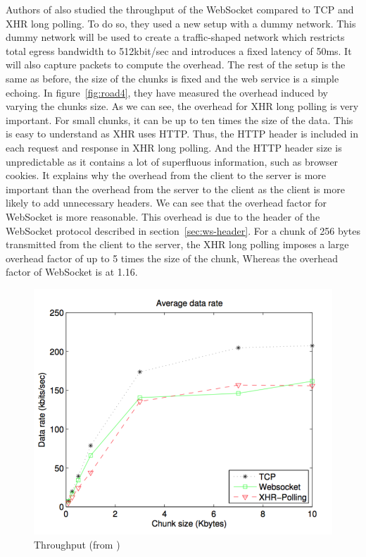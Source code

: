 \documentclass[10pt,journal,compsoc]{IEEEtran}
\newcommand{\ws}{WebSocket}
\begin{document}
Authors of \cite{roadblock} also studied the throughput of the \ws{} compared to TCP and XHR long polling.
To do so, they used a new setup with a dummy network. %
This dummy network will be used to create a traffic-shaped network which restricts total egress bandwidth to 512kbit/sec and introduces a fixed latency of 50ms.
It will also capture packets to compute the overhead.
The rest of the setup is the same as before, the size of the chunks is fixed and the web service is a simple echoing.
In figure~\ref{fig:road4}, they have measured the overhead induced by varying the chunks size. %
As we can see, the overhead for XHR long polling is very important.
For small chunks, it can be up to ten times the size of the data. %
This is easy to understand as XHR uses HTTP.
Thus, the HTTP header is included in each request and response in XHR long polling.
And the HTTP header size is unpredictable as it contains a lot of superfluous information, such as browser cookies. %
It explains why the overhead from the client to the server is more important than the overhead from the server to the client as the client is more likely to add unnecessary headers.
We can see that the overhead factor for \ws{} is more reasonable.
This overhead is due to the header of the \ws{} protocol described in section~\ref{sec:ws-header}.
For a chunk of 256 bytes transmitted from the client to the server, the XHR long polling imposes a large overhead factor of up to 5 times the size of the chunk, Whereas the overhead factor of \ws{} is at 1.16. %


\begin{figure}[!ht]
    \centering
    \includegraphics[width=\linewidth]{road3.png}
    \caption{Throughput (from \cite{roadblock})}
    \label{fig:road3}
\end{figure}
\end{document}
